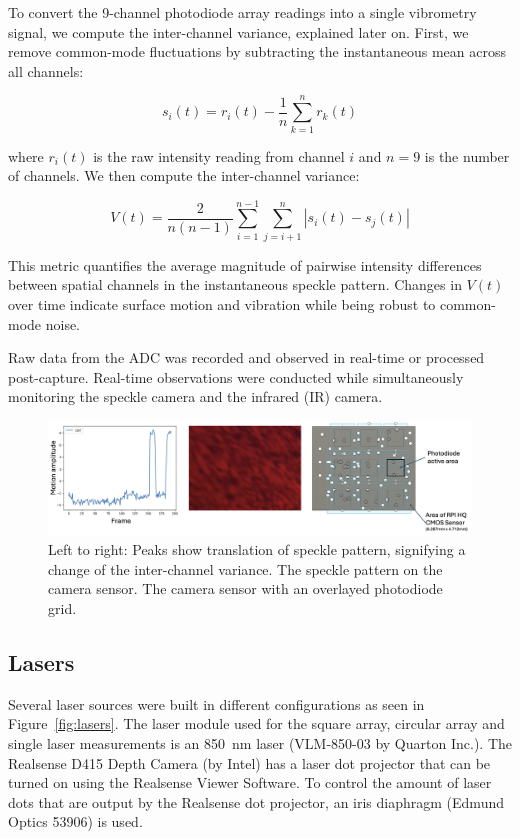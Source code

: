 To convert the 9-channel photodiode array readings into a single vibrometry signal, we compute the inter-channel variance, explained later on. 
First, we remove common-mode fluctuations by subtracting the instantaneous mean across all channels:

\begin{equation}
s_i(t) = r_i(t) - \frac{1}{n}\sum_{k=1}^{n} r_k(t)
\end{equation}

where $r_i(t)$ is the raw intensity reading from channel $i$ and $n=9$ is the number of channels. We then compute the inter-channel variance:

\begin{equation}
V(t) = \frac{2}{n(n-1)} \sum_{i=1}^{n-1} \sum_{j=i+1}^{n} |s_i(t) - s_j(t)|
\end{equation}

This metric quantifies the average magnitude of pairwise intensity differences between spatial channels in the instantaneous speckle pattern. 
Changes in $V(t)$ over time indicate surface motion and vibration while being robust to common-mode noise.

Raw data from the ADC was recorded and observed in real-time or processed post-capture. 
Real-time observations were conducted while simultaneously monitoring the speckle camera and the infrared (IR) camera.

\begin{figure}[t]
  \centering
  \includegraphics[width=\textwidth]{figures/impl/emulated2.png}
  \caption{Left to right: Peaks show translation of speckle pattern, signifying a change of the inter-channel variance. The speckle pattern on the camera sensor. The camera sensor with an overlayed photodiode grid.}
  \label{fig:emulated2}
\end{figure}


\subsection{Lasers}

Several laser sources were built in different configurations as seen in Figure~\ref{fig:lasers}. 
The laser module used for the square array, circular array and single laser measurements is an 850~nm laser (VLM-850-03 by Quarton Inc.).
The Realsense D415 Depth Camera (by Intel) has a laser dot projector that can be turned on using the Realsense Viewer Software. 
To control the amount of laser dots that are output by the Realsense dot projector, an iris diaphragm (Edmund Optics 53906) is used.

